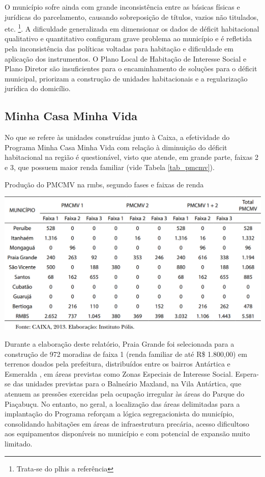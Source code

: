 	O município sofre ainda com grande inconsistência entre as básicas físicas e jurídicas do parcelamento, causando sobreposição de títulos, vazios não titulados, etc. \cite{pmpg2011b}\footnote{Trata-se do \gls{plhis} a referência }. A dificuldade generalizada em dimensionar os dados de déficit habitacional qualitativo e quantitativo configuram grave problema ao município e é refletida pela inconsistência das políticas voltadas para habitação e dificuldade em aplicação dos instrumentos. O Plano Local de Habitação de Interesse Social e Plano Diretor são insuficientes para o encaminhamento de soluções para o déficit municipal, priorizam a construção de unidades habitacionais e a regularização jurídica do domicílio.
	
	\subsection{Minha Casa Minha Vida}
	
	No que se refere às unidades construídas junto à Caixa, a efetividade do Programa Minha Casa Minha Vida com relação à diminuição do déficit habitacional na região é questionável, visto que atende, em grande parte, faixas 2 e 3, que possuem maior renda familiar (vide Tabela \ref{tab_pmcmv}).
	
	\begin{table}[h]
		\centering
		\caption{Produção do PMCMV na \gls{rmbs}, segundo fases e faixas de renda}
		\includegraphics[width=1\textwidth]{img/tab_pmcmv.png}
		\label{tab_pmcmv}
	\end{table}
	
	Durante a elaboração deste relatório, Praia Grande foi selecionada para a construção de 972 moradias de faixa 1 (renda familiar de até R\$ 1.800,00) em terrenos doados pela prefeitura, distribuídos entre os bairros Antártica e Esmeralda \cite{pmpg2017l}, em áreas previstas como Zonas Especiais de Interesse Social. Espera-se das unidades previstas para o Balneário Maxland, na Vila Antártica, que atenuem as pressões exercidas pela ocupação irregular às áreas do Parque do Piaçabuçu. No entanto, no geral, a localização das áreas delimitadas para a implantação do Programa reforçam a lógica segregacionista do município, consolidando habitações em áreas de infraestrutura precária, acesso dificultoso aos equipamentos disponíveis no município e com potencial de expansão muito limitado.
	
